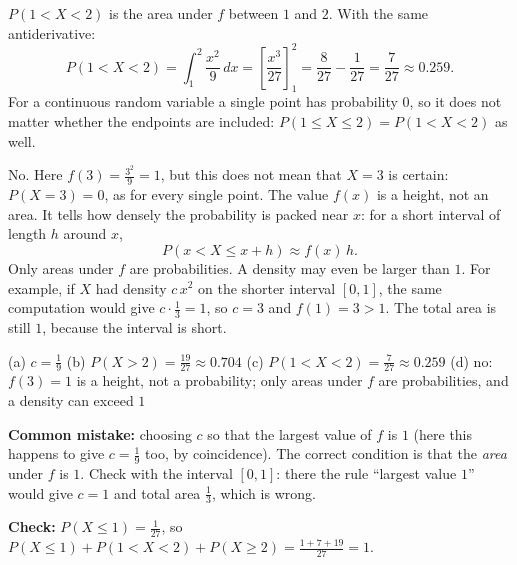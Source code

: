 \begin{solution}
	 $P(1<X<2)$ is the area under $f$ between $1$ and $2$. With the
	same antiderivative:
	\[
		P(1<X<2)=\int_1^2\frac{x^2}{9}\,dx=\left[\frac{x^3}{27}\right]_1^2
		=\frac{8}{27}-\frac{1}{27}=\frac{7}{27}\approx 0.259 .
	\]
	For a continuous random variable a single point has probability $0$, so it
	does not matter whether the endpoints are included:
	$P(1\le X\le 2)=P(1<X<2)$ as well.

	 No. Here $f(3)=\frac{3^2}{9}=1$, but this does not mean that
	$X=3$ is certain: $P(X=3)=0$, as for every single point. The value $f(x)$
	is a height, not an area. It tells how densely the probability is packed
	near $x$: for a short interval of length $h$ around $x$,
	\[
		P(x<X\le x+h)\approx f(x)\,h .
	\]
	Only areas under $f$ are probabilities. A density may even be larger than
	$1$. For example, if $X$ had density $c\,x^2$ on the shorter interval
	$[0,1]$, the same computation would give $c\cdot\frac13=1$, so $c=3$ and
	$f(1)=3>1$. The total area is still $1$, because the interval is short.

	\begin{answer}
		(a) $c=\frac19$ \quad
		(b) $P(X>2)=\frac{19}{27}\approx0.704$ \quad
		(c) $P(1<X<2)=\frac{7}{27}\approx0.259$ \quad
		(d) no: $f(3)=1$ is a height, not a probability; only areas under $f$
		are probabilities, and a density can exceed $1$
	\end{answer}
	\begin{remark}
		\textbf{Common mistake:} choosing $c$ so that the largest value of $f$
		is $1$ (here this happens to give $c=\frac19$ too, by coincidence).
		The correct condition is that the \emph{area} under $f$ is $1$. Check
		with the interval $[0,1]$: there the rule ``largest value $1$'' would
		give $c=1$ and total area $\frac13$, which is wrong.

		\smallskip
		\textbf{Check:} $P(X\le1)=\frac1{27}$, so
		$P(X\le1)+P(1<X<2)+P(X\ge2)=\frac{1+7+19}{27}=1$.
	\end{remark}
\end{solution}
